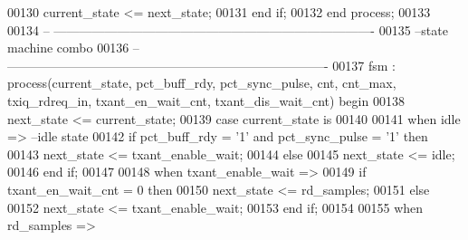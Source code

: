 \begin{DoxyCode}
00130         \textcolor{vhdlchar}{current_state} \textcolor{vhdlchar}{<=} \textcolor{vhdlchar}{next_state};
00131     \textcolor{keywordflow}{end} \textcolor{keywordflow}{if}; 
00132 \textcolor{keywordflow}{end} \textcolor{keywordflow}{process};
00133 
00134 \textcolor{keyword}{-- ----------------------------------------------------------------------------}
00135 \textcolor{keyword}{--state machine combo}
00136 \textcolor{keyword}{-- ----------------------------------------------------------------------------}
00137 fsm : \textcolor{keywordflow}{process}(current_state, pct_buff_rdy, pct_sync_pulse, cnt, cnt_max, 
      txiq_rdreq_in, txant_en_wait_cnt,        txant_dis_wait_cnt) \textcolor{keywordflow}{begin}
00138     \textcolor{vhdlchar}{next_state} \textcolor{vhdlchar}{<=} \textcolor{vhdlchar}{current_state};
00139     \textcolor{keywordflow}{case} \textcolor{vhdlchar}{current_state} \textcolor{keywordflow}{is}
00140       
00141         \textcolor{keywordflow}{when} \textcolor{vhdlchar}{idle} \textcolor{vhdlchar}{=}\textcolor{vhdlchar}{>}\textcolor{keyword}{ --idle state}
00142          \textcolor{keywordflow}{if} \textcolor{vhdlchar}{pct_buff_rdy} \textcolor{vhdlchar}{=} \textcolor{vhdlchar}{'}\textcolor{vhdllogic}{}\textcolor{vhdllogic}{1}\textcolor{vhdlchar}{'} \textcolor{keywordflow}{and} \textcolor{vhdlchar}{pct_sync_pulse} \textcolor{vhdlchar}{=} \textcolor{vhdlchar}{'}\textcolor{vhdllogic}{}\textcolor{vhdllogic}{1}\textcolor{vhdlchar}{'} \textcolor{keywordflow}{then} 
00143             \textcolor{vhdlchar}{next_state} \textcolor{vhdlchar}{<=} \textcolor{vhdlchar}{txant\_enable\_wait};
00144          \textcolor{keywordflow}{else} 
00145             \textcolor{vhdlchar}{next_state} \textcolor{vhdlchar}{<=} \textcolor{vhdlchar}{idle};
00146          \textcolor{keywordflow}{end} \textcolor{keywordflow}{if};
00147          
00148       \textcolor{keywordflow}{when} \textcolor{vhdlchar}{txant\_enable\_wait} \textcolor{vhdlchar}{=}\textcolor{vhdlchar}{>}
00149          \textcolor{keywordflow}{if} \textcolor{vhdlchar}{txant_en_wait_cnt} \textcolor{vhdlchar}{=} \textcolor{vhdllogic}{}\textcolor{vhdllogic}{0} \textcolor{keywordflow}{then} 
00150             \textcolor{vhdlchar}{next_state} \textcolor{vhdlchar}{<=} \textcolor{vhdlchar}{rd\_samples};
00151          \textcolor{keywordflow}{else} 
00152             \textcolor{vhdlchar}{next_state} \textcolor{vhdlchar}{<=} \textcolor{vhdlchar}{txant\_enable\_wait};
00153          \textcolor{keywordflow}{end} \textcolor{keywordflow}{if};
00154                
00155       \textcolor{keywordflow}{when} \textcolor{vhdlchar}{rd\_samples} \textcolor{vhdlchar}{=}\textcolor{vhdlchar}{>}

\end{DoxyCode}
